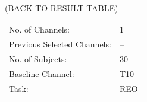 \documentclass[oneside, a4paper,10pt]{report}
\begin{document}
\newpage

\hspace*{12cm}\hyperlink{tab:TestResults}{(BACK TO RESULT TABLE)}

\bigskip
\bigskip

\begin{tabular}{ll}
  No. of Channels: & 1\\
  Previous Selected Channels: & --\\
  No. of Subjects: & 30\\
  Baseline Channel: & T10\\
  Task:	& REO 
\end{tabular}

\bigskip
\end{document}
